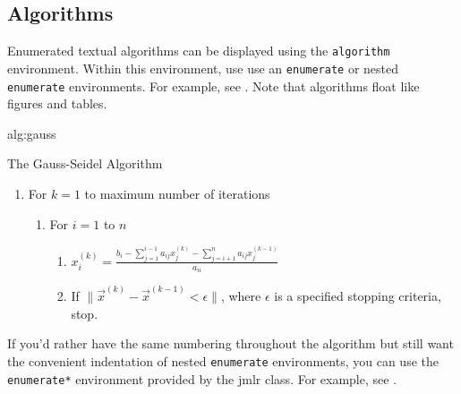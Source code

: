 \documentclass[pmlr]{jmlr}%
\begin{document}
\subsection{Algorithms}
\label{sec:algorithms}

Enumerated textual algorithms can be displayed using the
\texttt{algorithm} environment. Within this environment, use
use an \texttt{enumerate} or nested \texttt{enumerate} environments.
For example, see . Note that algorithms
float like figures and tables.

\begin{algorithm}[htbp]
\floatconts
{alg:gauss}%
{\caption{The Gauss-Seidel Algorithm}}
{%
\begin{enumerate}
  \item For $k=1$ to maximum number of iterations
    \begin{enumerate}
      \item For $i=1$ to $n$
        \begin{enumerate}
        \item $x_i^{(k)} = 
          \frac{b_i - \sum_{j=1}^{i-1}a_{ij}x_j^{(k)}
          - \sum_{j=i+1}^{n}a_{ij}x_j^{(k-1)}}{a_{ii}}$
        \item If $\|\vec{x}^{(k)}-\vec{x}^{(k-1)} < \epsilon\|$,
          where $\epsilon$ is a specified stopping criteria, stop.
      \end{enumerate}
    \end{enumerate}
\end{enumerate}
}
\end{algorithm}

If you'd rather have the same numbering throughout the algorithm
but still want the convenient indentation of nested 
\texttt{enumerate} environments, you can use the
\texttt{enumerate*} environment provided by the \textsf{jmlr}
class. For example, see .
\end{document}
